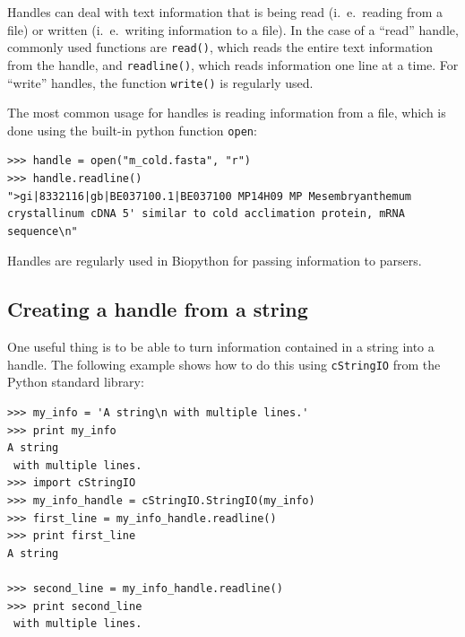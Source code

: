 \documentclass{report}
\begin{document}
Handles can deal with text information that is being read (i.~e.~reading 
from a file) or written (i.~e.~writing information to a file). In the
case of a ``read'' handle, commonly used functions are \verb|read()|,
which reads the entire text information from the handle, and
\verb|readline()|, which reads information one line at a time. For
``write'' handles, the function \verb|write()| is regularly used.


The most common usage for handles is reading information from a file,
which is done using the built-in python function \verb|open|:

\begin{verbatim}
>>> handle = open("m_cold.fasta", "r")
>>> handle.readline()
">gi|8332116|gb|BE037100.1|BE037100 MP14H09 MP Mesembryanthemum crystallinum cDNA 5' similar to cold acclimation protein, mRNA sequence\n"
\end{verbatim}

Handles are regularly used in Biopython for passing information to parsers.

\subsection{Creating a handle from a string}

One useful thing is to be able to turn information contained in a
string into a handle. The following example shows how to do this using 
\verb|cStringIO| from the Python standard library:

\begin{verbatim}
>>> my_info = 'A string\n with multiple lines.'
>>> print my_info
A string
 with multiple lines.
>>> import cStringIO
>>> my_info_handle = cStringIO.StringIO(my_info)
>>> first_line = my_info_handle.readline()
>>> print first_line
A string

>>> second_line = my_info_handle.readline()
>>> print second_line
 with multiple lines.
\end{verbatim}
\end{document}
